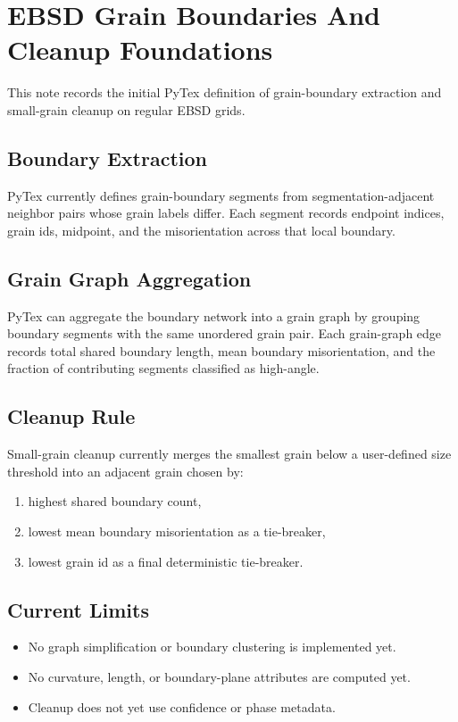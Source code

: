 \section{EBSD Grain Boundaries And Cleanup Foundations}

This note records the initial PyTex definition of grain-boundary extraction and small-grain cleanup on regular EBSD grids.

\subsection{Boundary Extraction}

PyTex currently defines grain-boundary segments from segmentation-adjacent neighbor pairs whose grain labels differ. Each segment records endpoint indices, grain ids, midpoint, and the misorientation across that local boundary.

\subsection{Grain Graph Aggregation}

PyTex can aggregate the boundary network into a grain graph by grouping boundary segments with the same unordered grain pair. Each grain-graph edge records total shared boundary length, mean boundary misorientation, and the fraction of contributing segments classified as high-angle.

\subsection{Cleanup Rule}

Small-grain cleanup currently merges the smallest grain below a user-defined size threshold into an adjacent grain chosen by:

\begin{enumerate}
  \item highest shared boundary count,
  \item lowest mean boundary misorientation as a tie-breaker,
  \item lowest grain id as a final deterministic tie-breaker.
\end{enumerate}

\subsection{Current Limits}

\begin{itemize}
  \item No graph simplification or boundary clustering is implemented yet.
  \item No curvature, length, or boundary-plane attributes are computed yet.
  \item Cleanup does not yet use confidence or phase metadata.
\end{itemize}
